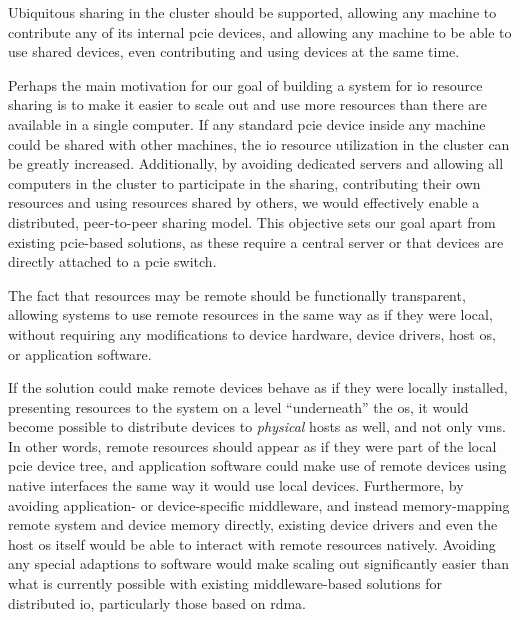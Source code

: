 \begin{objective}\label{obj:distributed}
    Ubiquitous sharing in the cluster should be supported, allowing any machine to contribute any of its internal \gls{pcie} devices, and allowing any machine to be able to use shared devices, even contributing and using devices at the same time.
\end{objective}
Perhaps the main motivation for our goal of building a system for \gls{io} resource sharing is to make it easier to scale out and use more resources than there are available in a single computer. 
If any standard \gls{pcie} device inside any machine could be shared with other machines, the \gls{io} resource utilization in the cluster can be greatly increased.
Additionally, by avoiding dedicated servers and allowing all computers in the cluster to participate in the sharing, contributing their own resources and using resources shared by others, we would effectively enable a distributed, peer-to-peer sharing model. 
This objective sets our goal apart from existing \gls{pcie}-based solutions, as these require a central server or that devices are directly attached to a \gls{pcie} switch.



\begin{objective}\label{obj:transparent}
    The fact that resources may be remote should be functionally transparent, allowing systems to use remote resources in the same way as if they were local, without requiring any modifications to device hardware, device drivers, host \gls{os}, or application software.
\end{objective}
If the solution could make remote devices behave as if they were locally installed, presenting resources to the system on a level ``underneath'' the \gls{os}, it would become possible to distribute devices to \emph{physical} hosts as well, and not only \glspl{vm}. 
In other words, remote resources should appear as if they were part of the local \gls{pcie} device tree, and application software could make use of remote devices using native interfaces the same way it would use local devices.
%
Furthermore, by avoiding application- or device-specific \gls{middleware}, and instead memory-mapping remote system and device memory directly, existing device drivers and even the host \gls{os} itself would be able to interact with remote resources natively.
Avoiding any special adaptions to software would make scaling out significantly easier than what is currently possible with existing \gls{middleware}-based solutions for distributed \gls{io}, particularly those based on \gls{rdma}.



